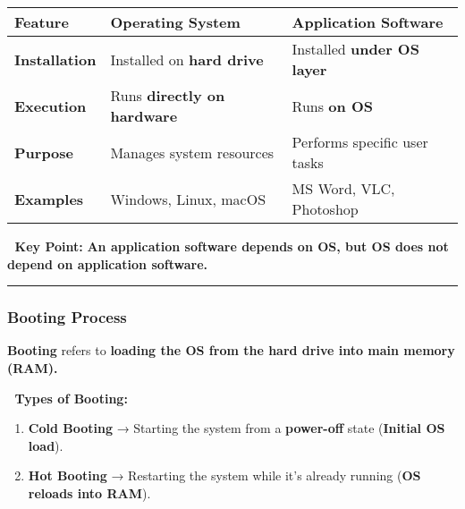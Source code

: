 \documentclass[
]{article}
\providecommand{\tightlist}{%
  \setlength{\itemsep}{0pt}\setlength{\parskip}{0pt}}
\begin{document}
\begin{longtable}[]{@{}
  >{\raggedright\arraybackslash}p{}
  >{\raggedright\arraybackslash}p{}
  >{\raggedright\arraybackslash}p{}@{}}
\toprule\noalign{}
\begin{minipage}[b]{\linewidth}\raggedright
Feature
\end{minipage} & \begin{minipage}[b]{\linewidth}\raggedright
\textbf{Operating System}
\end{minipage} & \begin{minipage}[b]{\linewidth}\raggedright
\textbf{Application Software}
\end{minipage} \\
\midrule\noalign{}
\endhead
\bottomrule\noalign{}
\endlastfoot
\textbf{Installation} & Installed on \textbf{hard drive} & Installed
\textbf{under OS layer} \\
\textbf{Execution} & Runs \textbf{directly on hardware} & Runs
\textbf{on OS} \\
\textbf{Purpose} & Manages system resources & Performs specific user
tasks \\
\textbf{Examples} & Windows, Linux, macOS & MS Word, VLC, Photoshop \\
\end{longtable}

📌 \textbf{Key Point:} \textbf{An application software depends on OS,
but OS does not depend on application software.}

\begin{center}\rule{0.5\linewidth}{0.5pt}\end{center}

\subsubsection{\texorpdfstring{\textbf{Booting
Process}}{Booting Process}}\label{booting-process}

\textbf{Booting} refers to \textbf{loading the OS from the hard drive
into main memory (RAM).}

📌 \textbf{Types of Booting:}

\begin{enumerate}
\def\labelenumi{\arabic{enumi}.}
\tightlist
\item
  \textbf{Cold Booting} → Starting the system from a \textbf{power-off}
  state (\textbf{Initial OS load}).
\item
  \textbf{Hot Booting} → Restarting the system while it's already
  running (\textbf{OS reloads into RAM}).
\end{enumerate}
\end{document}
